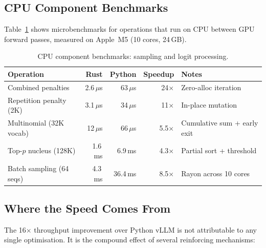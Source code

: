 \documentclass[11pt,a4paper]{article}
\newcommand{\thead}[1]{\textbf{\color{white}#1}}
\begin{document}
\subsection{CPU Component Benchmarks}

Table~\ref{tab:cpu_bench} shows microbenchmarks for operations that run on CPU
between GPU forward passes, measured on Apple~M5 (10 cores, 24\,GB).

\begin{table}[t]
  \centering
  \caption{CPU component benchmarks: sampling and logit processing.}
  \label{tab:cpu_bench}
  \small
  \begin{tabular}{@{}lrrrp{3.2cm}@{}}
    \toprule
    \rowcolor{HeaderBlue} \thead{Operation} & \thead{Rust} & \thead{Python} & \thead{Speedup} & \thead{Notes} \\
    \midrule
    Combined penalties      & 2.6\,$\mu$s  & 63\,$\mu$s  & 24$\times$  & Zero-alloc iteration \\
    \rowcolor{gray!8}
    Repetition penalty (2K) & 3.1\,$\mu$s  & 34\,$\mu$s  & 11$\times$  & In-place mutation \\
    Multinomial (32K vocab)  & 12\,$\mu$s   & 66\,$\mu$s  & 5.5$\times$ & Cumulative sum + early exit \\
    \rowcolor{gray!8}
    Top-$p$ nucleus (128K)  & 1.6\,ms      & 6.9\,ms     & 4.3$\times$ & Partial sort + threshold \\
    Batch sampling (64 seqs) & 4.3\,ms     & 36.4\,ms    & 8.5$\times$ & Rayon across 10 cores \\
    \bottomrule
  \end{tabular}
\end{table}

\subsection{Where the Speed Comes From}

The 16$\times$ throughput improvement over Python vLLM is not attributable to any
single optimisation. It is the compound effect of several reinforcing mechanisms:
\end{document}
